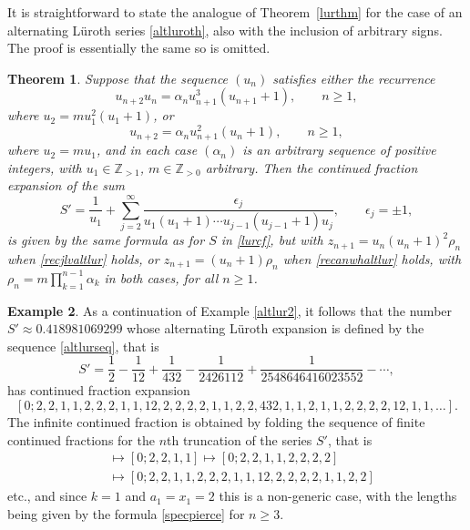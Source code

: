 \documentclass[12pt,a4paper]{amsart}
\newtheorem{theorem}{Theorem}[section]
\theoremstyle{definition}
\newtheorem{example}[theorem]{Example}
\numberwithin{equation}{section}
\newcommand\al{{\alpha}}
\newcommand\eps{{\epsilon}}
\newcommand{\Z}{\mathbb{Z}}
\begin{document}
It is straightforward to state the analogue of Theorem~\ref{lurthm} for the case 
of an alternating L\"uroth series \eqref{altluroth}, also with the inclusion of arbitrary 
signs. The proof is essentially the same so is omitted. 

\begin{theorem}
\label{altlurthm} 
Suppose that the sequence $(u_n)$ satisfies 
either the recurrence 
\begin{equation}
\label{recjlvaltlur}
u_{n+2}u_n = \al_{n} u_{n+1}^3 (u_{n+1}+1), \qquad n\geq 1, 
\end{equation} 
where $u_2=mu_1^2(u_1+1)$, 
or 
\begin{equation}
\label{recanwhaltlur} 
u_{n+2} = \al_{n} u_{n+1}^2(u_n+1), \qquad n\geq 1, 
\end{equation} 
where $u_2=mu_1$, and 
in each case $(\al_n)$ is an arbitrary sequence of positive integers, with 
$u_1\in\Z_{>1}$, $m\in\Z_{>0}$ arbitrary. 
Then 
the continued fraction expansion of the sum 
\begin{equation}
\label{saltluroth} 
  S' = \frac{1}{u_1} + \sum_{j=2}^{\infty} \frac{\eps_j}{u_{1}(u_{1}+1) \cdots 
  u_{j-1}(u_{j-1}+1) u_{j}}, \qquad \eps_j=\pm 1,
\end{equation} 
is given by the same formula as for $S$ in \eqref{lurcf}, 
but with $z_{n+1} = u_{n}(u_{n}+1)^2\rho_{n}$ when \eqref{recjlvaltlur} holds, 
or $z_{n+1} = (u_{n}+1)\rho_{n}$ when \eqref{recanwhaltlur} holds, with 
$\rho_n = m \prod_{k=1}^{n-1}\al_k$ in both cases, for all $n\geq 1$. 
\end{theorem}

\begin{example}
\label{altlur2cont}
As a continuation of Example \ref{altlur2}, 
it follows that the number $S'\approx 0.418981069299$ whose alternating L\"uroth expansion is defined 
by the sequence \eqref{altlurseq}, that is 
\[ 
S'=\frac{1}{2}-\frac{1}{12} +\frac{1}{432}-\frac{1}{2426112}+\frac{1}{2548646416023552}-\cdots, 
\] 
has continued fraction expansion 
\small
\[
[0;2,2,1,1,2,2,2,1,1,12,2,2,2,2,1,1,2,2,432,1,1,2,1,1,2,2,2,2,12,1,1,\ldots].
\]
\normalsize 
The infinite continued fraction is obtained by folding the sequence of finite continued fractions 
for the $n$th truncation of the series $S'$, that is 
\begin{align*} 
[0;2] & \mapsto [0;2,2,1,1]  
\mapsto [0;2,2,1,1,2,2,2,2] \\ 
& \mapsto 
[0;2,2,1,1,2,2,2,1,1,12,2,2,2,2,1,1,2,2]
\end{align*}
etc., and since $k=1$ and $a_1=x_1=2$ this is a non-generic case, with the lengths being given 
by the formula \eqref{specpierce} for $n\geq 3$. 
\end{example} 
\end{document}

